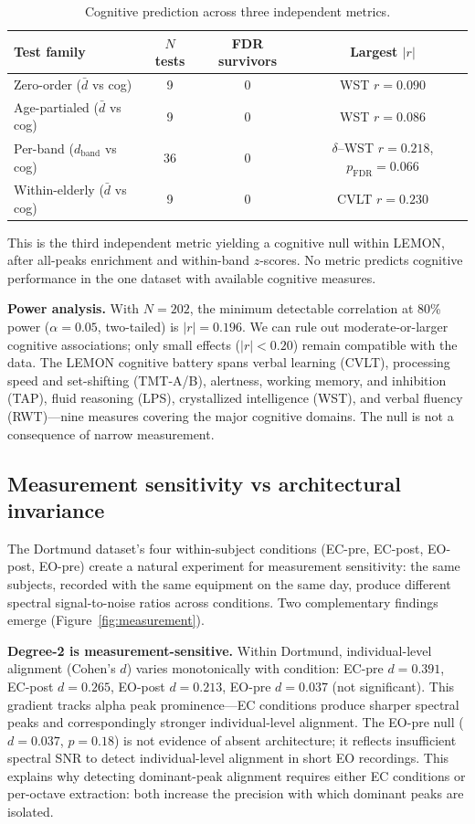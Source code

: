 \documentclass[11pt,a4paper]{article}
\begin{document}
\begin{table}[H]
\centering
\caption{Cognitive prediction across three independent metrics.}
\label{tab:cognitive_null}
\begin{tabular}{lccc}
\toprule
Test family & $N$ tests & FDR survivors & Largest $|r|$ \\
\midrule
Zero-order ($\bar{d}$ vs cog) & 9 & 0 & WST $r = 0.090$ \\
Age-partialed ($\bar{d}$ vs cog) & 9 & 0 & WST $r = 0.086$ \\
Per-band ($d_{\text{band}}$ vs cog) & 36 & 0 & $\delta$--WST $r = 0.218$, $p_{\text{FDR}} = 0.066$ \\
Within-elderly ($\bar{d}$ vs cog) & 9 & 0 & CVLT $r = 0.230$ \\
\bottomrule
\end{tabular}
\end{table}

This is the third independent metric yielding a cognitive null within LEMON, after all-peaks enrichment and within-band $z$-scores. No metric predicts cognitive performance in the one dataset with available cognitive measures.

\textbf{Power analysis.} With $N = 202$, the minimum detectable correlation at 80\% power ($\alpha = 0.05$, two-tailed) is $|r| = 0.196$. We can rule out moderate-or-larger cognitive associations; only small effects ($|r| < 0.20$) remain compatible with the data. The LEMON cognitive battery spans verbal learning (CVLT), processing speed and set-shifting (TMT-A/B), alertness, working memory, and inhibition (TAP), fluid reasoning (LPS), crystallized intelligence (WST), and verbal fluency (RWT)---nine measures covering the major cognitive domains. The null is not a consequence of narrow measurement.

\subsection{Measurement sensitivity vs architectural invariance}
\label{sec:measurement}

The Dortmund dataset's four within-subject conditions (EC-pre, EC-post, EO-post, EO-pre) create a natural experiment for measurement sensitivity: the same subjects, recorded with the same equipment on the same day, produce different spectral signal-to-noise ratios across conditions. Two complementary findings emerge (Figure~\ref{fig:measurement}).

\textbf{Degree-2 is measurement-sensitive.} Within Dortmund, individual-level alignment (Cohen's $d$) varies monotonically with condition: EC-pre $d = 0.391$, EC-post $d = 0.265$, EO-post $d = 0.213$, EO-pre $d = 0.037$ (not significant). This gradient tracks alpha peak prominence---EC conditions produce sharper spectral peaks and correspondingly stronger individual-level alignment. The EO-pre null ($d = 0.037$, $p = 0.18$) is not evidence of absent architecture; it reflects insufficient spectral SNR to detect individual-level alignment in short EO recordings. This explains why detecting dominant-peak alignment requires either EC conditions or per-octave extraction: both increase the precision with which dominant peaks are isolated.
\end{document}

